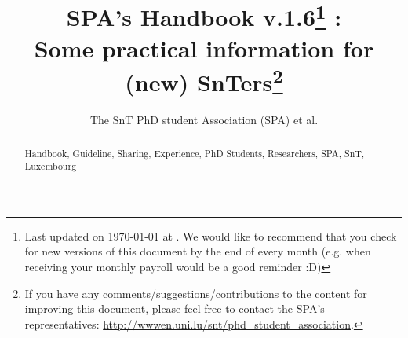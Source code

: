 \documentclass[runningheads,a4paper]{llncs}
\newcommand{\keywords}[1]{\par\addvspace\baselineskip
\noindent\keywordname\enspace\ignorespaces#1}
\newcommand{\SAPcv}{1.6}
\begin{document}
\mainmatter  %

\title{SPA's Handbook v.\SAPcv\thanks{Last updated on \ukvardate\today\xspace at \currenttime.
We would like to recommend that you check for new versions of this document by the end of every month (e.g. when receiving your monthly payroll would be a good reminder :D)} : \\
Some practical information for (new) SnTers\thanks{If you have any comments/suggestions/contributions to the content for improving this document, please feel free to contact the SPA's representatives: \url{http://wwwen.uni.lu/snt/phd_student_association}.}}


\author{The SnT PhD student Association (SPA) et al.
}
%

\maketitle

\begin{abstract}


\keywords{Handbook, Guideline, Sharing, Experience, PhD Students, Researchers, SPA, SnT, Luxembourg}
\end{abstract}

\setcounter{secnumdepth}{2}
\setcounter{tocdepth}{2}
\begin{spacing}{1.3}
\tableofcontents
\end{spacing}

\newpage
\end{document}

